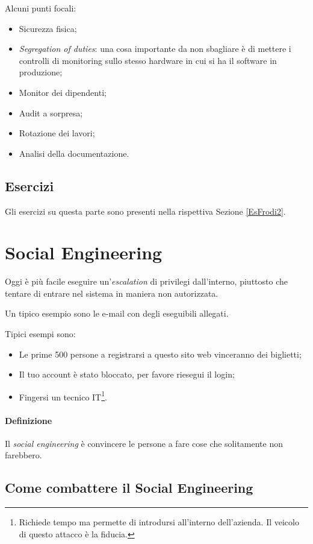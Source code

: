 Alcuni punti focali:
\begin{itemize}
  \item Sicurezza fisica;
  \item \textit{Segregation of duties}: una cosa importante da non sbagliare è
  di mettere i controlli di monitoring
  sullo stesso hardware in cui si ha il software in produzione;
  \item Monitor dei dipendenti;
  \item Audit a sorpresa;
  \item Rotazione dei lavori;
  \item Analisi della documentazione.
\end{itemize}


\subsection{Esercizi}

Gli esercizi su questa parte sono presenti nella rispettiva Sezione
\ref{EsFrodi2}.

\section{Social Engineering}
		
Oggi è più facile eseguire un'\textit{escalation} di privilegi dall'interno,
piuttosto che tentare di entrare nel sistema in maniera non autorizzata.

Un tipico esempio sono le e-mail con degli eseguibili allegati.

Tipici esempi sono:
\begin{itemize}
  \item Le prime 500 persone a registrarsi a questo sito web vinceranno dei
  biglietti;
  \item Il tuo account è stato bloccato, per favore riesegui il login;
  \item Fingersi un tecnico IT\footnote{Richiede tempo ma permette di
introdursi all'interno dell'azienda. Il veicolo di questo attacco è la 
fiducia.}.
\end{itemize}

\paragraph*{Definizione} Il \textit{social engineering} è convincere le persone
a fare cose che solitamente non farebbero.

\subsection{Come combattere il Social Engineering}

